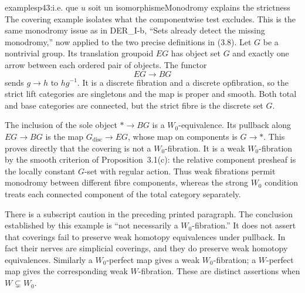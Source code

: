 \begin{dcomment}{examples}{p43:i.e. que $u$ soit un isomorphisme}{Monodromy explains the strictness}
The covering example isolates what the componentwise test excludes. This is the same monodromy issue as in DER\_I-b, ``Sets already detect the missing monodromy,'' now applied to the two precise definitions in (3.8). Let $G$ be a nontrivial group. Its translation groupoid $E G$ has object set $G$ and exactly one arrow between each ordered pair of objects. The functor
\[
 E G\longrightarrow B G
\]
sends $g\longrightarrow h$ to $hg^{-1}$. It is a discrete fibration and a discrete opfibration, so the strict lift categories are singletons and the map is proper and smooth. Both total and base categories are connected, but the strict fibre is the discrete set $G$.

The inclusion of the sole object $*\longrightarrow BG$ is a $W_0$-equivalence. Its pullback along $EG\longrightarrow BG$ is the map $G_{\mathrm{disc}}\longrightarrow EG$, whose map on components is $G\longrightarrow *$. This proves directly that the covering is not a $W_0$-fibration. It is a weak $W_0$-fibration by the smooth criterion of Proposition~3.1(c): the relative component presheaf is the locally constant $G$-set with regular action. Thus weak fibrations permit monodromy between different fibre components, whereas the strong $W_0$ condition treats each connected component of the total category separately.

There is a subscript caution in the preceding printed paragraph. The conclusion established by this example is ``not necessarily a $W_0$-fibration.'' It does not assert that coverings fail to preserve weak homotopy equivalences under pullback. In fact their nerves are simplicial coverings, and they do preserve weak homotopy equivalences. Similarly a $W_0$-perfect map gives a weak $W_0$-fibration; a $W$-perfect map gives the corresponding weak $W$-fibration. These are distinct assertions when $W\subsetneq W_0$.
\end{dcomment}

